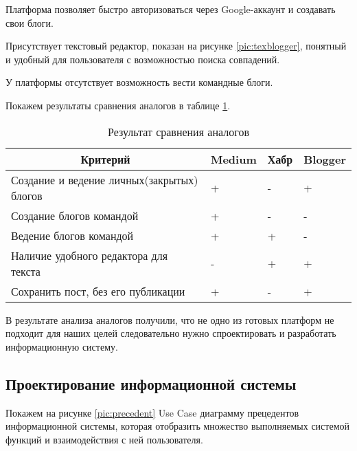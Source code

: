 Платформа позволяет быстро авторизоваться через Google-аккаунт и создавать свои блоги.

Присутствует текстовый редактор, показан на рисунке \ref{pic:texblogger}, понятный и удобный для пользователя с возможностью поиска совпадений.


У платформы отсутствует возможность вести командные блоги.

Покажем результаты сравнения аналогов в таблице \ref{tabular:analogi}.

\begin{table}[H]
	\caption{Результат сравнения аналогов}
	\label{tabular:analogi}
	\begin{center}
		\begin{tabular}{|l|l|l|l|}
			\hline
			\multicolumn{1}{|c|}{Критерий}             & \multicolumn{1}{c|}{Medium} & \multicolumn{1}{c|}{Хабр} & \multicolumn{1}{c|}{Blogger} \\ \hline
			Создание и ведение личных(закрытых) блогов & +                           & -                         & +                            \\ \hline
			Создание блогов командой                   & +                           & -                         & -                            \\ \hline
			Ведение блогов командой                    & +                           & +                         & -                            \\ \hline
			Наличие удобного редактора для текста      & -                           & +                         & +                            \\ \hline
			Сохранить пост, без его публикации         & +                           & -                         & +                            \\ \hline
		\end{tabular}
	\end{center}
\end{table}
В результате анализа аналогов получили, что не одно из готовых платформ не подходит для наших целей следовательно нужно спроектировать и разработать информационную систему.

\pagebreak

\subsection{Проектирование информационной системы}

Покажем на рисунке \ref{pic:precedent} Use Case диаграмму прецедентов информационной системы, которая отобразить множество выполняемых системой функций и взаимодействия с ней пользователя. 
 

\pagebreak